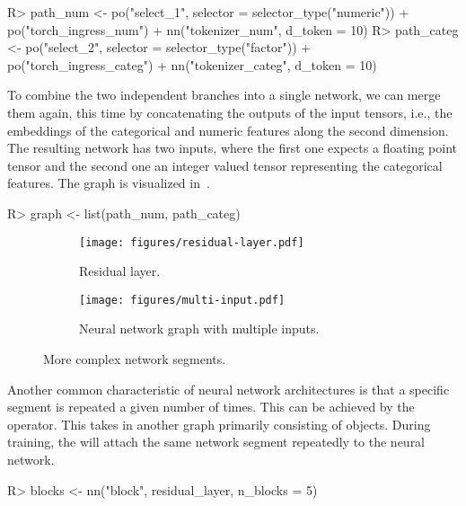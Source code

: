 \documentclass[article]{jss}
\theoremstyle{definition}
\begin{document}
\begin{CodeInput}
R> path_num <- po("select_1", selector = selector_type("numeric")) %
+    po("torch_ingress_num") %
+    nn("tokenizer_num", d_token = 10)
R> path_categ <- po("select_2", selector = selector_type("factor")) %
+    po("torch_ingress_categ") %
+    nn("tokenizer_categ", d_token = 10)
\end{CodeInput}

To combine the two independent branches into a single network, we can merge them again, this time by concatenating the outputs of the input tensors, i.e., the embeddings of the categorical and numeric features along the second dimension.
The resulting network has two inputs, where the first one expects a floating point tensor and the second one an integer valued tensor representing the categorical features.
The graph is visualized in~.

\begin{CodeInput}
R> graph <- list(path_num, path_categ) %
\end{CodeInput}

\begin{figure}[h]
    \centering
    \begin{subfigure}{0.38\textwidth}
        \centering
        \texttt{[image: figures/residual-layer.pdf]}
        \caption{Residual layer.}
        \label{fig:residual-layer}
    \end{subfigure}
    \hfill
    \begin{subfigure}{0.58\textwidth}
        \centering
        \texttt{[image: figures/multi-input.pdf]}
        \caption{Neural network graph with multiple inputs.}
        \label{fig:multi-inputs}
    \end{subfigure}
    \caption{More complex network segments.}
    \label{fig:side-by-side}
\end{figure}

Another common characteristic of neural network architectures is that a specific segment is repeated a given number of times.
This can be achieved by the  operator.
This  takes in another graph primarily consisting of  objects.
During training, the  will attach the same network segment repeatedly to the neural network.

\begin{CodeInput}
R> blocks <- nn("block", residual_layer, n_blocks = 5)
\end{CodeInput}
\end{document}
